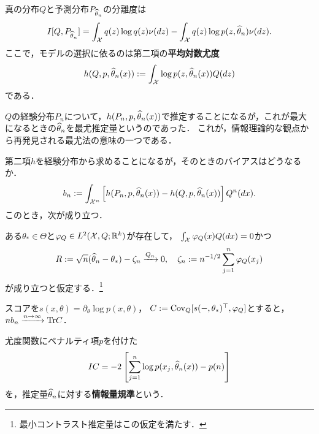 \documentclass[uplatex,dvipdfmx]{jsreport}
\begin{document}
\begin{discussion}[KL情報量の最小化と平均対数尤度の最大化は同値]
    真の分布$Q$と予測分布$P_{\widehat{\theta}_n}$の分離度は
    \[I[Q,P_{\widehat{\theta}_n}]=\int_{\mathcal{X}} q(z)\log q(z)\nu(dz)-\int_{\mathcal{X}} q(z)\log p(z,\widehat{\theta}_n)\nu(dz).\]
    ここで，モデルの選択に依るのは第二項の\textbf{平均対数尤度}
    \[h(Q,p,\widehat{\theta}_n(x)):=\int_{\mathcal{X}}\log p(z,\widehat{\theta}_n(x))Q(dz)\]
    である．
\end{discussion}
\begin{remarks}
    $Q$の経験分布$P_n$について，$h(P_n,p,\widehat{\theta}_n(x))$で推定することになるが，これが最大になるときの$\widehat{\theta}_n$を最尤推定量というのであった．
    これが，情報理論的な観点から再発見される最尤法の意味の一つである．
\end{remarks}

\begin{discussion}[バイアスの推定]
    第二項$h$を経験分布から求めることになるが，そのときのバイアスはどうなるか．
    \[b_n:=\int_{\mathcal{X}^n}\left[h(P_n,p,\widehat{\theta}_n(x))-h(Q,p,\widehat{\theta}_n(x))\right]Q^n(dx).\]
    このとき，次が成り立つ．
\end{discussion}

\begin{theorem}
    ある$\theta_*\in\Theta$と$\varphi_Q\in L^2(\mathcal{X},Q;\mathbb{R}^k)$が存在して，
    $\int_{\mathcal{X}}\varphi_Q(x)Q(dx)=0$かつ
    \[R:=\sqrt{n}(\widehat{\theta}_n-\theta_*)-\zeta_n\xrightarrow{Q_n}0,\quad\zeta_n:=n^{-1/2}\sum_{j=1}^n\varphi_Q(x_j)\]
    が成り立つと仮定する．\footnote{最小コントラスト推定量はこの仮定を満たす．}

    スコアを$s(x,\theta)=\partial_\theta\log p(x,\theta)$，
    $C:=\mathrm{Cov}_Q[s(-,\theta_*)^\top,\varphi_Q]$とすると，
    $nb_n\xrightarrow{n\to\infty}\mathrm{Tr} C$．
\end{theorem}

\begin{definition}
    尤度関数にペナルティ項$p$を付けた
    \[IC=-2\left[\sum^n_{j=1}\log p(x_j,\widehat{\theta}_n(x))-p(n)\right]\]
    を，推定量$\widehat{\theta}_n$に対する\textbf{情報量規準}という．
\end{definition}
\end{document}
